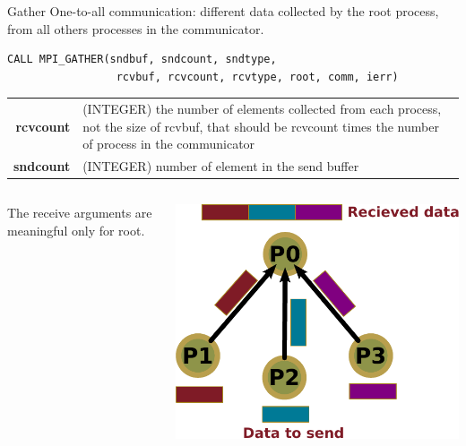 \documentclass[aspectratio=43]{beamer}
\begin{document}
\begin{frame}[fragile]{Gather}
One-to-all communication: different data collected by the root process, from all others processes in the communicator.\\
\footnotesize
\begin{verbatim}
CALL MPI_GATHER(sndbuf, sndcount, sndtype,
                 rcvbuf, rcvcount, rcvtype, root, comm, ierr)
\end{verbatim}
\normalsize
\begin{black1block}{}
\begin{tabular}{rp{8cm}}
\textbf{rcvcount} & (INTEGER) the number of elements collected from each process, not the size of rcvbuf, that should be rcvcount times the number of process in the communicator\\
\textbf{sndcount} & (INTEGER) number of element in the send buffer\\
\end{tabular}
\end{black1block}
\begin{columns}
    \begin{column}{0.7\paperwidth}
        \hspace{1cm}The receive arguments are meaningful only for root.
    \end{column}
    \begin{column}{0.3\paperwidth}
    \includegraphics[scale=0.3]{03.MPI_Coll/gather.pdf}\\
    \end{column}
\end{columns}
\end{frame}
\end{document}
